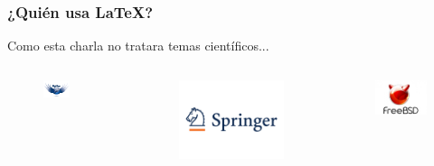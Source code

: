 \documentclass{beamer}
\begin{document}
\begin{frame}
	\frametitle{¿Quién usa \LaTeX?}
	\centering Como esta charla no tratara temas científicos...
	\vspace{-10px}
	\begin{columns}[c]
		\begin{figure}
			\centering
			\includegraphics[width=0.6\textwidth]{images/Fg_wings_large}
		\end{figure}
		\vspace{-35px}
		\begin{figure}
			\centering
			\includegraphics[width=0.6\linewidth]{images/Springer-logo-logotype}
		\end{figure}
		\vspace{-35pt}
		\begin{figure}
			\centering
			\includegraphics[width=0.6\linewidth]{images/freebsd}
		\end{figure} \pause

\end{columns}
\end{frame}
\end{document}
